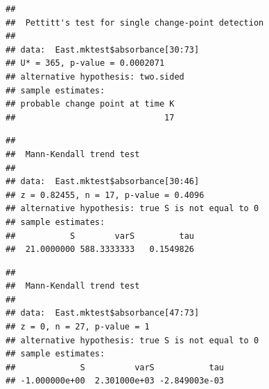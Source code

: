 \documentclass[12pt,]{article}
\newenvironment{Shaded}{\begin{snugshade}}{\end{snugshade}}
\newcommand{\KeywordTok}[1]{\textcolor[rgb]{0.13,0.29,0.53}{\textbf{#1}}}
\newcommand{\DecValTok}[1]{\textcolor[rgb]{0.00,0.00,0.81}{#1}}
\newcommand{\CommentTok}[1]{\textcolor[rgb]{0.56,0.35,0.01}{\textit{#1}}}
\newcommand{\OperatorTok}[1]{\textcolor[rgb]{0.81,0.36,0.00}{\textbf{#1}}}
\newcommand{\NormalTok}[1]{#1}
\begin{document}
\begin{Shaded}
\end{Shaded}

\begin{verbatim}
## 
##  Pettitt's test for single change-point detection
## 
## data:  East.mktest$absorbance[30:73]
## U* = 365, p-value = 0.0002071
## alternative hypothesis: two.sided
## sample estimates:
## probable change point at time K 
##                              17
\end{verbatim}

\begin{Shaded}
\end{Shaded}

\begin{verbatim}
## 
##  Mann-Kendall trend test
## 
## data:  East.mktest$absorbance[30:46]
## z = 0.82455, n = 17, p-value = 0.4096
## alternative hypothesis: true S is not equal to 0
## sample estimates:
##           S        varS         tau 
##  21.0000000 588.3333333   0.1549826
\end{verbatim}

\begin{Shaded}
\end{Shaded}

\begin{verbatim}
## 
##  Mann-Kendall trend test
## 
## data:  East.mktest$absorbance[47:73]
## z = 0, n = 27, p-value = 1
## alternative hypothesis: true S is not equal to 0
## sample estimates:
##             S          varS           tau 
## -1.000000e+00  2.301000e+03 -2.849003e-03
\end{verbatim}
\end{document}
